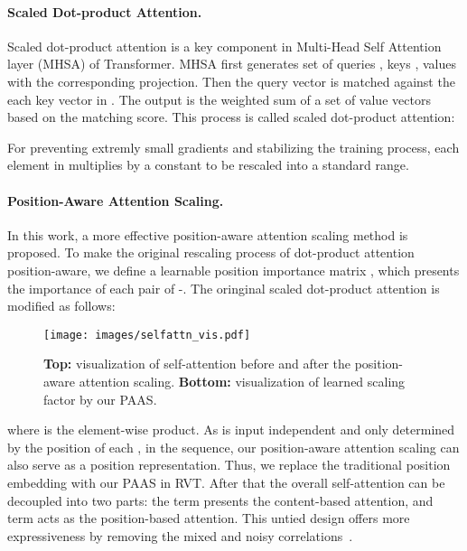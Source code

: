 \documentclass[10pt,twocolumn,letterpaper]{article}
\begin{document}
\paragraph{Scaled Dot-product Attention.} Scaled dot-product attention is a key component in Multi-Head Self Attention layer (MHSA) of Transformer. MHSA first generates set of queries , keys , values  with the corresponding projection. Then the query vector  is matched against the each key vector in . The output is the weighted sum of a set of  value vectors  based on the matching score. This process is called scaled dot-product attention:



For preventing extremly small gradients and stabilizing the training process, each element in  multiplies by a constant  to be rescaled into a standard range. 

\paragraph{Position-Aware Attention Scaling.} In this work, a more effective position-aware attention scaling method is proposed. To make the original rescaling process of dot-product attention position-aware, we define a learnable position importance matrix , which presents the importance of each pair of -. The oringinal scaled dot-product attention is modified as follows:


\begin{figure}
\centering
\texttt{[image: images/selfattn\_vis.pdf]}
\caption{\textbf{Top: }visualization of self-attention before and after the position-aware attention scaling. \textbf{Bottom: }visualization of learned scaling factor by our PAAS. }
\label{fig:robust_PAAS}
\vspace{-5mm}
\end{figure}

where  is the element-wise product. As  is input independent and only determined by the position of each ,  in the sequence, our position-aware attention scaling can also serve as a position representation. Thus, we replace the traditional position embedding with our PAAS in RVT. After that the overall self-attention can be decoupled into two parts: the  term presents the content-based attention, and  term acts as the position-based attention. This untied design offers more expressiveness by removing the mixed and noisy correlations~\cite{ke2020rethinking}.
\end{document}
